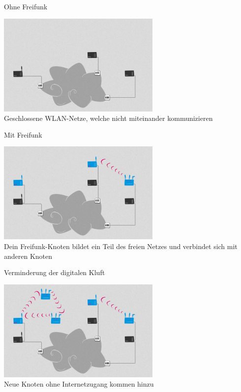 \documentclass[10pt]{beamer}
\begin{document}
  \begin{frame}{Ohne Freifunk}
    \begin{center}
      \includegraphics[height=5cm]{images/network_1}\\
      \vspace{1em}
      Geschlossene WLAN-Netze, welche nicht miteinander kommunizieren\\
      \vspace{1em}
    \end{center}
  \end{frame}

  \begin{frame}{Mit Freifunk}
    \begin{center}
      \includegraphics[height=5cm]{images/network_2}\\
      \vspace{1em}
      Dein Freifunk-Knoten bildet ein Teil des freien Netzes und verbindet sich mit anderen Knoten
    \end{center}
  \end{frame}

  \begin{frame}{Verminderung der digitalen Kluft}
    \begin{center}
      \includegraphics[height=5cm]{images/network_3}\\
      \vspace{1em}
      Neue Knoten ohne Internetzugang kommen hinzu\\
      \vspace{1em}
    \end{center}
  \end{frame}
\end{document}
